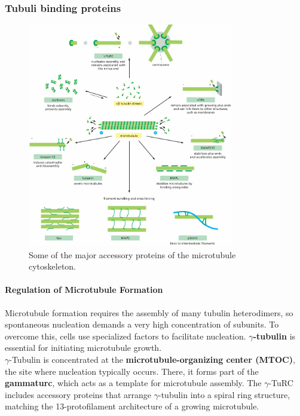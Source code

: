 \documentclass[../main.tex]{subfiles}
\begin{document}
\subsubsection{Tubuli binding proteins}

\begin{figure}[H]
	\centering
	\includegraphics[width = 0.8\textwidth]{20}
	\caption{Some of the major accessory proteins of the microtubule cytoskeleton.}
\end{figure}

\paragraph{Regulation of Microtubule Formation}

Microtubule formation requires the assembly of many tubulin heterodimers, so spontaneous nucleation demands a very high concentration of subunits. To overcome this, cells use specialized factors to facilitate nucleation. \textbf{$\gamma$-tubulin} is essential for initiating microtubule growth. \\
\indent $\gamma$-Tubulin is concentrated at the \textbf{microtubule-organizing center (MTOC)}, the site where nucleation typically occurs. There, it forms part of the \textbf{\gls{gammaturc}}, which acts as a template for microtubule assembly. The $\gamma$-TuRC includes accessory proteins that arrange $\gamma$-tubulin into a spiral ring structure, matching the 13-protofilament architecture of a growing microtubule.
\end{document}
